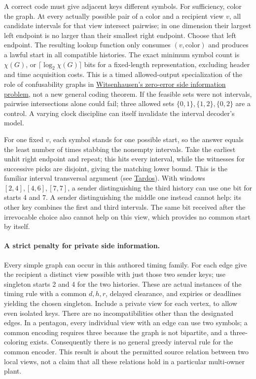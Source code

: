 \documentclass{article}
\begin{document}
A correct code must give adjacent keys different symbols. For
sufficiency, color the graph. At every actually possible pair
of a color and a recipient view \(v\), all candidate intervals
for that view intersect pairwise; in one dimension their largest
left endpoint is no larger than their smallest right endpoint.
Choose that left endpoint. The resulting lookup function only
consumes \((v,\text{color})\) and produces a lawful start in all
compatible histories. The exact minimum symbol count is
\(\chi(G)\), or \(\lceil\log_2\chi(G)\rceil\) bits for a fixed-length
representation, excluding header and time acquisition costs.
This is a timed allowed-output specialization of the role of
confusability graphs in
\href{https://ieeexplore.ieee.org/document/1055607/}{Witsenhausen's
zero-error side information problem}, not a new general coding theorem.
If the feasible sets were not intervals, pairwise intersections
alone could fail; three allowed sets \(\{0,1\},\{1,2\},\{0,2\}\)
are a control. A varying clock discipline can itself invalidate the
interval decoder's model.

For one fixed \(v\), each symbol stands for one possible start,
so the answer equals the least number of times stabbing the
nonempty intervals. Take the earliest unhit right endpoint and repeat;
this hits every interval, while the witnesses for successive picks
are disjoint, giving the matching lower bound. This is the familiar
interval transversal argument (see
\href{https://www.renyi.hu/~tardos/2int.pdf}{Tardos}).
With windows \([2,4],[4,6],[7,7]\), a sender distinguishing the
third history can use one bit for starts 4 and 7. A sender
distinguishing the middle one instead cannot help: its other
key combines the first and third intervals. The same bit
received after the irrevocable choice also cannot help on this view,
which provides no common start by itself.

\paragraph{A strict penalty for private side information.}
Every simple graph can occur in this authored timing family.
For each edge give the recipient a distinct view possible with
just those two sender keys; use singleton starts 2 and 4 for
the two histories. These are actual instances of the timing
rule with a common \(d,h,r\), delayed clearance, and expiries
or deadlines yielding the chosen singleton. Include a private
view for each vertex, to allow even isolated keys.
There are no incompatibilities other than the designated edges.
In a pentagon, every individual view with an edge can use
two symbols; a common encoding requires three because the
graph is not bipartite, and a three-coloring exists.
Consequently there is no general greedy interval rule for the
common encoder. This result is about the permitted source relation
between two local views, not a claim that all these relations
hold in a particular multi-owner plant.
\end{document}
